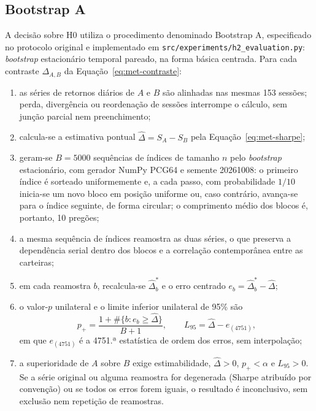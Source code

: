 \documentclass{eic-bcc-tcc}
\begin{document}
\subsection{Bootstrap A}

A decisão sobre H0 utiliza o procedimento denominado Bootstrap A, especificado no protocolo original e implementado em \texttt{src/experiments/h2\_evaluation.py}: \textit{bootstrap} estacionário temporal pareado, na forma básica centrada. Para cada contraste $\Delta_{A,B}$ da Equação~\eqref{eq:met-contraste}:

\begin{enumerate}
    \item as séries de retornos diários de $A$ e $B$ são alinhadas nas mesmas 153 sessões; perda, divergência ou reordenação de sessões interrompe o cálculo, sem junção parcial nem preenchimento;
    \item calcula-se a estimativa pontual $\hat{\Delta} = S_A - S_B$ pela Equação~\eqref{eq:met-sharpe};
    \item geram-se $B = 5000$ sequências de índices de tamanho $n$ pelo \textit{bootstrap} estacionário, com gerador NumPy PCG64 e semente 20261008: o primeiro índice é sorteado uniformemente e, a cada passo, com probabilidade $1/10$ inicia-se um novo bloco em posição uniforme ou, caso contrário, avança-se para o índice seguinte, de forma circular; o comprimento médio dos blocos é, portanto, 10 pregões;
    \item a mesma sequência de índices reamostra as duas séries, o que preserva a dependência serial dentro dos blocos e a correlação contemporânea entre as carteiras;
    \item em cada reamostra $b$, recalcula-se $\hat{\Delta}^{*}_{b}$ e o erro centrado $e_b = \hat{\Delta}^{*}_{b} - \hat{\Delta}$;
    \item o valor-$p$ unilateral e o limite inferior unilateral de 95\% são
    \begin{equation}
    p_{+} = \frac{1 + \#\{b : e_b \geq \hat{\Delta}\}}{B + 1}, \qquad L_{95} = \hat{\Delta} - e_{(4751)},
    \label{eq:met-bootstrap}
    \end{equation}
    em que $e_{(4751)}$ é a 4751.ª estatística de ordem dos erros, sem interpolação;
    \item a superioridade de $A$ sobre $B$ exige estimabilidade, $\hat{\Delta} > 0$, $p_{+} < \alpha$ e $L_{95} > 0$. Se a série original ou alguma reamostra for degenerada (Sharpe atribuído por convenção) ou se todos os erros forem iguais, o resultado é inconclusivo, sem exclusão nem repetição de reamostras.
\end{enumerate}
\end{document}
